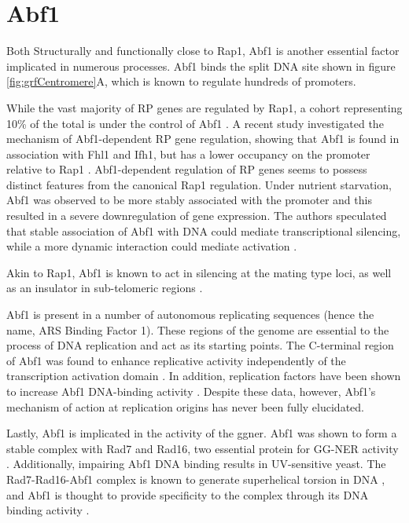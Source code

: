 \section{Abf1}

Both Structurally and functionally close to Rap1, Abf1 is another essential factor implicated in numerous processes. 
Abf1 binds the split DNA site shown in figure \ref{fig:grfCentromere}A, which is known to regulate hundreds of promoters. 

While the vast majority of RP genes are regulated by Rap1, a cohort representing 10\% of the total is under the control of Abf1 \cite{dellaseta:1990:abf1}. 
A recent study investigated the mechanism of Abf1-dependent RP gene regulation, showing that Abf1 is found in association with Fhl1 and Ifh1, but has a lower occupancy on the promoter relative to Rap1 \cite{fermi:2016:multiple}. 
Abf1-dependent regulation of RP genes seems to possess distinct features from the canonical Rap1 regulation. 
Under nutrient starvation, Abf1 was observed to be more stably associated with the promoter and this resulted in a severe downregulation of gene expression. 
The authors speculated that stable association of Abf1 with DNA could mediate transcriptional silencing, while a more dynamic interaction could mediate activation \cite{fermi:2016:promoter}.

Akin to Rap1, Abf1 is known to act in silencing at the mating type loci, as well as an insulator in sub-telomeric regions \cite{mak:2009:dynamic}. 

Abf1 is present in a number of autonomous replicating sequences (hence the name, ARS Binding Factor 1). 
These regions of the genome are essential to the process of DNA replication and act as its starting points.
The C-terminal region of Abf1 was found to enhance replicative activity independently of the transcription activation domain \cite{wiltshire:1997:abf1p}. 
In addition, replication factors have been shown to increase Abf1 DNA-binding activity \cite{feng:1998:saccharomyces}. 
Despite these data, however, Abf1’s mechanism of action at replication origins has never been fully elucidated.

Lastly, Abf1 is implicated in the activity of the \gls{ggner}. 
Abf1 was shown to form a stable complex with Rad7 and Rad16, two essential protein for GG-NER activity  \cite{reed:1999:yeast}. 
Additionally, impairing Abf1 DNA binding results in UV-sensitive yeast. 
The Rad7-Rad16-Abf1 complex is known to generate superhelical torsion in DNA \cite{yu:2004:yeast}, and Abf1 is thought to provide specificity to the complex through its DNA binding activity \cite{Yu:2009:abf1binding}.

